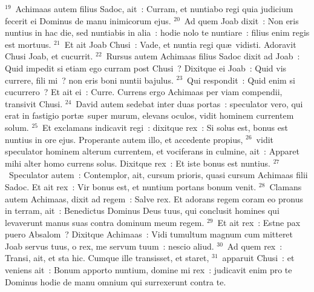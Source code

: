 ${}^{19}$~Achimaas autem filius Sadoc, ait~: Curram, et nuntiabo regi quia judicium fecerit ei Dominus de manu inimicorum ejus.
${}^{20}$~Ad quem Joab dixit~: Non eris nuntius in hac die, sed nuntiabis in alia~: hodie nolo te nuntiare~: filius enim regis est mortuus.
${}^{21}$~Et ait Joab Chusi~: Vade, et nuntia regi qu\ae\ vidisti. Adoravit Chusi Joab, et cucurrit.
${}^{22}$~Rursus autem Achimaas filius Sadoc dixit ad Joab~: Quid impedit si etiam ego curram post Chusi~? Dixitque ei Joab~: Quid vis currere, fili mi~? non eris boni nuntii bajulus.
${}^{23}$~Qui respondit~: Quid enim si cucurrero~? Et ait ei~: Curre. Currens ergo Achimaas per viam compendii, transivit Chusi.
${}^{24}$~David autem sedebat inter duas portas~: speculator vero, qui erat in fastigio port\ae\ super murum, elevans oculos, vidit hominem currentem solum.
${}^{25}$~Et exclamans indicavit regi~: dixitque rex~: Si solus est, bonus est nuntius in ore ejus. Properante autem illo, et accedente propius,
${}^{26}$~vidit speculator hominem alterum currentem, et vociferans in culmine, ait~: Apparet mihi alter homo currens solus. Dixitque rex~: Et iste bonus est nuntius.
${}^{27}$~Speculator autem~: Contemplor, ait, cursum prioris, quasi cursum Achimaas filii Sadoc. Et ait rex~: Vir bonus est, et nuntium portans bonum venit.
${}^{28}$~Clamans autem Achimaas, dixit ad regem~: Salve rex. Et adorans regem coram eo pronus in terram, ait~: Benedictus Dominus Deus tuus, qui conclusit homines qui levaverunt manus suas contra dominum meum regem.
${}^{29}$~Et ait rex~: Estne pax puero Absalom~? Dixitque Achimaas~: Vidi tumultum magnum cum mitteret Joab servus tuus, o rex, me servum tuum~: nescio aliud.
${}^{30}$~Ad quem rex~: Transi, ait, et sta hic. Cumque ille transisset, et staret,
${}^{31}$~apparuit Chusi~: et veniens ait~: Bonum apporto nuntium, domine mi rex~: judicavit enim pro te Dominus hodie de manu omnium qui surrexerunt contra te.


